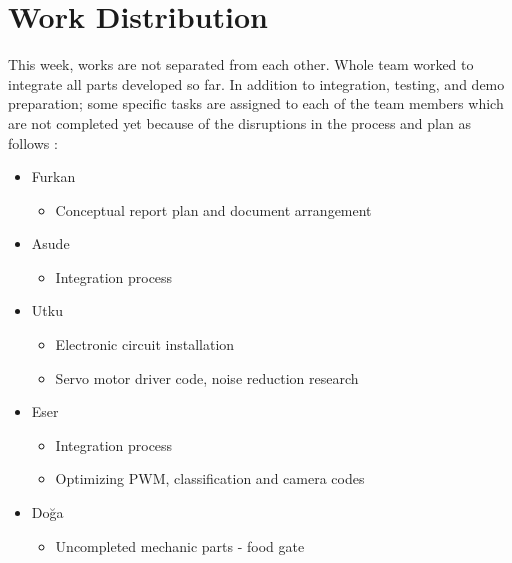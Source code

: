 \section{Work Distribution}
\label{sec:workDistribution}
This week, works are not separated from each other. Whole team worked to integrate all parts developed so far. In addition to integration, testing, and demo preparation; some specific tasks are assigned to each of the team members which are not completed yet because of the disruptions in the process and plan as follows :

\begin{itemize}
    \item Furkan
    \begin{itemize}
        \item  Conceptual report plan and document arrangement
    \end{itemize}
    \item Asude
    \begin{itemize}
        \item Integration process
    \end{itemize}
    \item Utku
    \begin{itemize}
        \item Electronic circuit installation
        \item Servo motor driver code, noise reduction research
    \end{itemize}
    \item Eser
    \begin{itemize}
        \item Integration process
        \item Optimizing PWM, classification and camera codes
    \end{itemize}
    \item Doğa
    \begin{itemize}
        \item Uncompleted mechanic parts - food gate
    \end{itemize}
\end{itemize}
